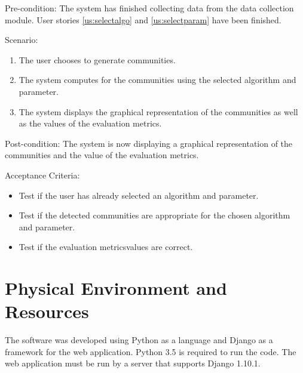 Pre-condition: The system has finished collecting data from the data collection module. User stories \ref{us:selectalgo} and \ref{us:selectparam} have been finished.


Scenario:
\begin{enumerate}
	\item The user chooses to generate communities.
	\item The system computes for the communities using the selected algorithm and parameter.
	\item The system displays the graphical representation of the communities as well as the values of the evaluation metrics.
\end{enumerate}


Post-condition: The system is now displaying a graphical representation of the communities and the value of the evaluation
metrics.


Acceptance Criteria:
\begin{itemize}
	\item Test if the user has already selected an algorithm and parameter.
	\item Test if the detected communities are appropriate for the chosen algorithm and parameter.
	\item Test if the evaluation metrics\vtick values are correct.
\end{itemize}


\section{Physical Environment and Resources}
The software was developed using Python as a language and Django as a framework for the web application. Python 3.5 is required to run the code. The web application must be run by a server that supports Django 1.10.1. 




